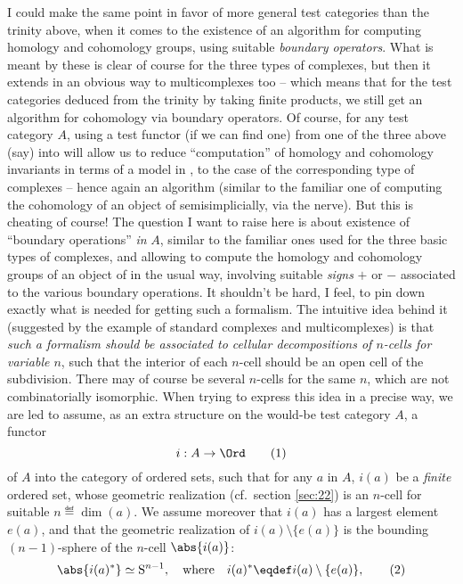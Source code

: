 \enspace
I could make the same point in favor of more general test categories
than the trinity above, when it comes to the existence of an algorithm
for computing homology and cohomology groups, using suitable
\emph{boundary operators}. What is meant by these is clear of course
for the three types of complexes, but then it extends in an obvious
way to multicomplexes too -- which means that for the test categories
deduced from the trinity by taking finite products, we still get an
algorithm for cohomology via boundary operators. Of course, for any
test category $A$, using a test functor (if we can find one) from one
of the three above (say) into \Ahat{} will allow us to reduce
``computation'' of homology and cohomology invariants in terms of a
model in \Ahat, to the case of the corresponding type of complexes --
hence again an algorithm (similar to the familiar one of computing the
cohomology of an object of \Cat{} semisimplicially, via the
nerve). But this is cheating of course! The question I want to raise
here is about existence of ``boundary operations'' \emph{in} $A$,
similar to the familiar ones used for the three basic types of
complexes, and allowing to compute the homology and cohomology groups
of an object of \Ahat{} in the usual way, involving suitable
\emph{signs} $+$ or $-$ associated to the various boundary
operations. It shouldn't be hard, I feel, to pin down
exactly what is needed for getting such a formalism. The intuitive
idea behind it (suggested by the example of standard complexes and
multicomplexes) is that \emph{such a formalism should be associated to
  cellular decompositions of $n$-cells for variable $n$}, such that
the interior of each $n$-cell should be an open cell of the
subdivision. There may of course be several $n$-cells for the same
$n$, which are not combinatorially isomorphic. When trying to express
this idea in a precise way, we are led to assume, as an extra
structure on the would-be test category $A$, a functor
\begin{equation}
  \label{eq:91.1}
  i:A\to\Ord\tag{1}
\end{equation}
of $A$ into the category of ordered sets, such that for any $a$ in
$A$, $i(a)$ be a \emph{finite} ordered set, whose geometric
realization (cf.\ section \ref{sec:22}) is an $n$-cell for suitable
$n\eqdef\dim(a)$. We assume moreover that $i(a)$ has a largest element
$e(a)$, and that the geometric realization of $i(a)\setminus\{e(a)\}$
is the bounding $(n-1)$-sphere of the $n$-cell $\abs{i(a)}$:
\begin{equation}
  \label{eq:91.2}
  \abs{i(a)^*} \simeq \mathrm S^{n-1}, \quad\text{where}\quad
  i(a)^* \eqdef i(a)\setminus\{e(a)\},\tag{2}
\end{equation}
